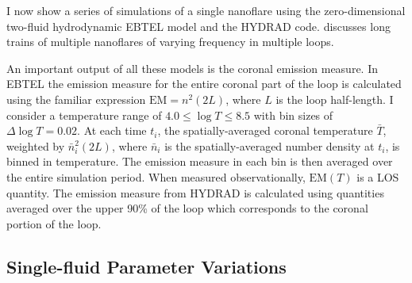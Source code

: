 I now show a series of simulations of a single nanoflare using the zero-dimensional two-fluid hydrodynamic EBTEL model and the HYDRAD code.  discusses long trains of multiple nanoflares of varying frequency in multiple loops.

An important output of all these models is the coronal emission measure. In EBTEL the emission measure for the entire coronal part of the loop is calculated using the familiar expression $\mathrm{EM}=n^2(2L)$, where $L$ is the loop half-length. I consider a temperature range of $4.0\le\log{T}\le8.5$ with bin sizes of $\Delta\log{T}=0.02$. At each time $t_i$, the spatially-averaged coronal temperature $\bar{T}$, weighted by $\bar{n}_i^2(2L)$, where $\bar{n}_i$ is the spatially-averaged number density at $t_i$, is binned in temperature. The emission measure in each bin is then averaged over the entire simulation period. When measured observationally, $\mathrm{EM}(T)$ is a LOS quantity. The emission measure from HYDRAD is calculated using quantities averaged over the upper 90\% of the loop which corresponds to the coronal portion of the loop.

\subsection{Single-fluid Parameter Variations}\label{hot-plasma:subsec:sf_par_var}


